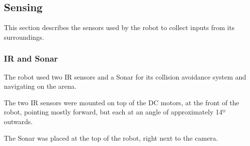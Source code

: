 
\subsection{Sensing}

This section describes the sensors used by the robot to collect inputs from its surroundings.

\subsubsection{IR and Sonar}

The robot used two IR sensors and a Sonar for its collision avoidance system and navigating on the arena.

The two IR sensors were mounted on top of the DC motors, at the front of the robot, pointing mostly forward, but each at an angle of approximately 14º outwards.

The Sonar was placed at the top of the robot, right next to the camera.

